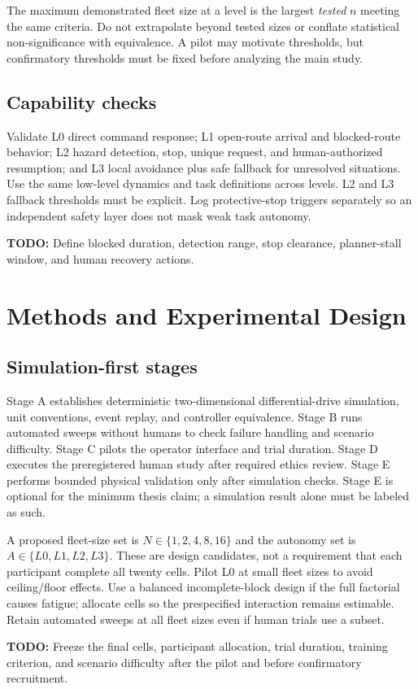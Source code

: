 \documentclass[12pt,oneside]{report}
\newcommand{\todo}[1]{\par\noindent\textcolor{red!65!black}{\textbf{TODO:} #1}\par}
\begin{document}
The maximum demonstrated fleet size at a level is the largest \emph{tested} $n$ meeting the same criteria. Do not extrapolate beyond tested sizes or conflate statistical non-significance with equivalence. A pilot may motivate thresholds, but confirmatory thresholds must be fixed before analyzing the main study.

\section{Capability checks}
Validate L0 direct command response; L1 open-route arrival and blocked-route behavior; L2 hazard detection, stop, unique request, and human-authorized resumption; and L3 local avoidance plus safe fallback for unresolved situations. Use the same low-level dynamics and task definitions across levels. L2 and L3 fallback thresholds must be explicit. Log protective-stop triggers separately so an independent safety layer does not mask weak task autonomy. \todo{Define blocked duration, detection range, stop clearance, planner-stall window, and human recovery actions.}
\chapter{Methods and Experimental Design}
\section{Simulation-first stages}
Stage A establishes deterministic two-dimensional differential-drive simulation, unit conventions, event replay, and controller equivalence. Stage B runs automated sweeps without humans to check failure handling and scenario difficulty. Stage C pilots the operator interface and trial duration. Stage D executes the preregistered human study after required ethics review. Stage E performs bounded physical validation only after simulation checks. Stage E is optional for the minimum thesis claim; a simulation result alone must be labeled as such.

A proposed fleet-size set is $N\in\{1,2,4,8,16\}$ and the autonomy set is $A\in\{L0,L1,L2,L3\}$. These are design candidates, not a requirement that each participant complete all twenty cells. Pilot L0 at small fleet sizes to avoid ceiling/floor effects. Use a balanced incomplete-block design if the full factorial causes fatigue; allocate cells so the prespecified interaction remains estimable. Retain automated sweeps at all fleet sizes even if human trials use a subset. \todo{Freeze the final cells, participant allocation, trial duration, training criterion, and scenario difficulty after the pilot and before confirmatory recruitment.}
\end{document}
